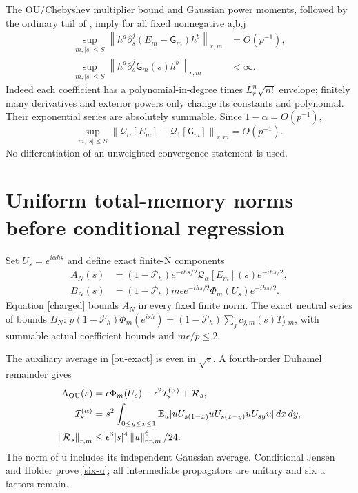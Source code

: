 \documentclass[11pt]{article}
\newcommand{\E}{\mathbb E}
\newcommand{\Pin}{\mathcal P_h}
\newcommand{\norm}[1]{\left\lVert#1\right\rVert}
\newcommand{\Qop}{\mathscr Q}
\begin{document}
The OU/Chebyshev multiplier bound and Gaussian power moments,
followed by the ordinary tail of \cite{gradient}, imply for all
fixed nonnegative a,b,j
\begin{align}
 \sup_{m,|s|\le S}\norm{h^a\partial_s^j(E_m-\mathsf G_m)h^b}_{r,m}
    &=O(p^{-1}),\nonumber\\
 \sup_{m,|s|\le S}\norm{h^a\partial_s^j\mathsf G_m(s)h^b}_{r,m}
    &<\infty.\label{weighted}
\end{align}
Indeed each coefficient has a polynomial-in-degree times
$L_r^n\sqrt{n!}$ envelope; finitely many derivatives and exterior
powers only change its constants and polynomial. Their exponential
series are absolutely summable. Since $1-\alpha=O(p^{-1})$,
\begin{equation}\label{charged}
 \sup_{m,|s|\le S}
 \norm{\Qop_\alpha[E_m]-\Qop_1[\mathsf G_m]}_{r,m}=O(p^{-1}).
\end{equation}
No differentiation of an unweighted convergence statement is used.

\newpage
\section{Uniform total-memory norms before conditional regression}
Set $U_s=e^{i\alpha hs}$ and define exact finite-N components
\begin{align*}
 A_N(s)&=(1-\Pin)e^{-ihs/2}\Qop_\alpha[E_m](s)e^{-ihs/2},\\
 B_N(s)&=(1-\Pin)m\epsilon e^{-ihs/2}\Phi_m(U_s)e^{-ihs/2}.
\end{align*}
Equation \eqref{charged} bounds $A_N$ in every fixed finite norm.
The exact neutral series of \cite{neutral} bounds $B_N$:
$p(1-\Pin)\Phi_m(e^{ish})=(1-\Pin)\sum_jc_{j,m}(s)T_{j,m}$,
with summable actual coefficient bounds and $m\epsilon/p\le2$.

The auxiliary average in \eqref{ou-exact} is even in
$\sqrt\epsilon$. A fourth-order Duhamel remainder gives
\begin{align}
 \Lambda_{\rm OU}(s)&=\epsilon\Phi_m(U_s)
       -\epsilon^2\mathcal I_s^{(\alpha)}+\mathcal R_s,\nonumber\\
 \mathcal I_s^{(\alpha)}&=s^2\int_{0\le y\le x\le1}
 \E_u[uU_{s(1-x)}uU_{s(x-y)}uU_{sy}u]\,dx\,dy,\label{dyson}\\
 \norm{\mathcal R_s}_{r,m}&\le
 \epsilon^3|s|^4\norm u_{6r,m}^6/24.\label{six-u}
\end{align}
The norm of u includes its independent Gaussian average. Conditional
Jensen and Holder prove \eqref{six-u}; all intermediate propagators
are unitary and six u factors remain.
\end{document}

